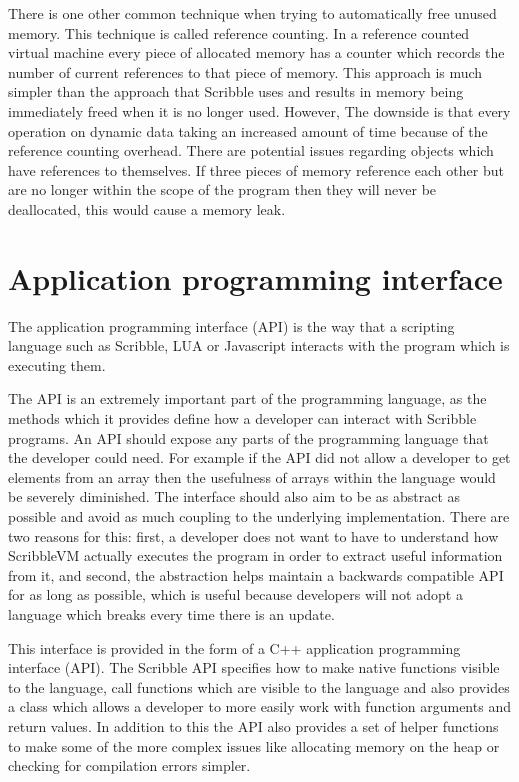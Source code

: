 \documentclass[]{final_report}
\begin{document}
There is one other common technique when trying to automatically free unused memory. This technique is called reference counting. In a reference counted virtual machine every piece of allocated memory has a counter which records the number of current references to that piece of memory. This approach is much simpler than the approach that Scribble uses and results in memory being immediately freed when it is no longer used. However, The downside is that every operation on dynamic data taking an increased amount of time because of the reference counting overhead. There are potential issues regarding objects which have references to themselves. If three pieces of memory reference each other but are no longer within the scope of the program then they will never be deallocated, this would cause a memory leak.

\chapter{Application programming interface}

The application programming interface (API) is the way that a scripting language such as Scribble, LUA or Javascript interacts with the program which is executing them.

The API is an extremely important part of the programming language, as the methods which it provides define how a developer can interact with Scribble programs. An API should expose any parts of the programming language that the developer could need. For example if the API did not allow a developer to get elements from an array then the usefulness of arrays within the language would be severely diminished. The interface should also aim to be as abstract as possible and avoid as much coupling to the underlying implementation. There are two reasons for this: first, a developer does not want to have to understand how ScribbleVM actually executes the program in order to extract useful information from it, and second, the abstraction helps maintain a backwards compatible API for as long as possible, which is useful because developers will not adopt a language which breaks every time there is an update.

This interface is provided in the form of a C++ application programming interface (API). The Scribble API specifies how to make native functions visible to the language, call functions which are visible to the language and also provides a class which allows a developer to more easily work with function arguments and return values. In addition to this the API also provides a set of helper functions to make some of the more complex issues like allocating memory on the heap or checking for compilation errors simpler.
\end{document}
